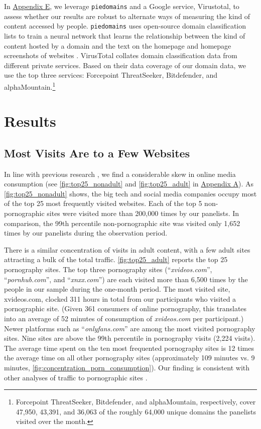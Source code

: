 \documentclass[12pt,twoside]{article}
\begin{document}
In \hyperref[sm:smE]{Appendix E}, we leverage \texttt{piedomains} and a Google service, Virustotal, to assess whether our results are robust to alternate ways of measuring the kind of content accessed by people. \texttt{piedomains} uses open-source domain classification lists to train a neural network that learns the relationship between the kind of content hosted by a domain and the text on the homepage and homepage screenshots of websites \citep{Chintalapati_piedomains_Predict_the_2022}. 
VirusTotal collates domain classification data from different private services. Based on their data coverage of our domain data, we use the top three services: Forcepoint ThreatSeeker, Bitdefender, and alphaMountain.\footnote{Forcepoint ThreatSeeker, Bitdefender, and alphaMountain, respectively, cover 47,950, 43,391, and 36,063 of the roughly 64,000 unique domains the panelists visited over the month.}


\section{Results}\label{sec:results}
\subsection{Most Visits Are to a Few Websites}
\label{subsec:concentration_media_consumption}

In line with previous research \citep{hindman2009myth, Dewan2004-tt}, we find a considerable skew in online media consumption (see \cref{fig:top25_nonadult} and \cref{fig:top25_adult} in \hyperref[sm:smA]{Appendix A}). As \cref{fig:top25_nonadult} shows, the big tech and social media companies occupy most of the top 25 most frequently visited websites. Each of the top 5 non-pornographic sites were visited more than 200,000 times by our panelists. In comparison, the 99th percentile non-pornographic site was visited only 1,652 times by our panelists during the observation period. 

There is a similar concentration of visits in adult content, with a few adult sites attracting a bulk of the total traffic. \cref{fig:top25_adult} reports the top 25 pornography sites. The top three pornography sites (``\textit{xvideos.com}'', ``\textit{pornhub.com}'', and ``\textit{xnxx.com}'') are each visited more than 6,500 times by the people in our sample during the one-month period. The most visited site, xvideos.com, clocked 311 hours in total from our participants who visited a pornographic site. (Given 361 consumers of online pornography, this translates into an average of 52 minutes of consumption of \textit{xvideos.com} per participant.) Newer platforms such as ``\textit{onlyfans.com}'' are among the most visited pornography sites. Nine sites are above the 99th percentile in pornography visits (2,224 visits). The average time spent on the ten most frequented pornography sites is 12 times the average time on all other pornography sites (approximately 109 minutes vs. 9 minutes, \cref{fig:concentration_porn_consumption}). Our finding is consistent with other analyses of traffic to pornographic sites \cite{webporn}.
\end{document}
